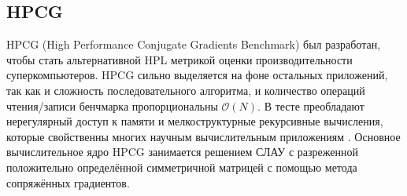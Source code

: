	\subsection{HPCG}

	HPCG (High Performance Conjugate Gradients Benchmark) был разработан, чтобы стать альтернативной HPL метрикой оценки производительности суперкомпьютеров. HPCG сильно выделяется на фоне остальных приложений, так как и сложность последовательного алгоритма, и количество операций чтения/записи бенчмарка пропорциональны \(\mathcal{O}(N)\). В тесте преобладают нерегулярный доступ к памяти и мелкоструктурные рекурсивные вычисления, которые свойственны многих научным вычислительным приложениям \cite{HPCG}. Основное вычислительное ядро HPCG занимается решением СЛАУ с разреженной положительно определённой симметричной матрицей с помощью метода сопряжённых градиентов.

